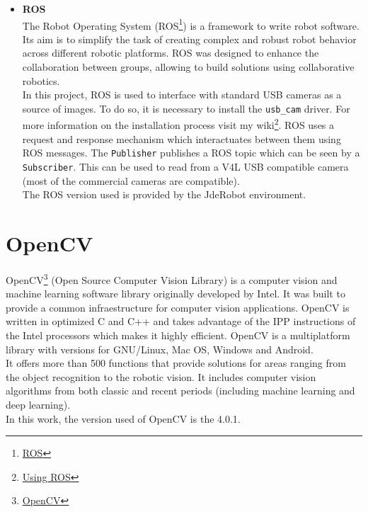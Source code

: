 \begin{itemize}
    \item \textbf{ROS}\\
The Robot Operating System (ROS\footnote {\href{https://www.ros.org/}{ROS}}) is a framework to write robot software. Its aim is to simplify the task of creating complex and robust robot behavior across different robotic platforms. ROS was designed to enhance the collaboration between groups, allowing to build solutions using collaborative robotics.\\
In this project, ROS is used to interface with standard USB cameras as a source of images. To do so, it is necessary to install the \texttt{usb\_cam} driver. For more information on the installation process visit my wiki\footnote {\label{using_ros}\href{https://jderobot.org/Arodriguez-tfm\#Week_24:_Introducing_ROS}{Using ROS}}. ROS uses a request and response mechanism which interactuates between them using ROS messages. The \texttt{Publisher} publishes a ROS topic which can be seen by a \texttt{Subscriber}. This can be used to read from a V4L USB compatible camera (most of the commercial cameras are compatible).\\
The ROS version used is provided by the JdeRobot environment.
\end{itemize}
\section{OpenCV}
OpenCV\footnote {\href{https://opencv.org/}{OpenCV}} (Open Source Computer Vision Library) is a computer vision and machine learning software library originally developed by Intel. It was built to provide a common infraestructure for computer vision applications. OpenCV is written in optimized C and C++ and takes advantage of the IPP instructions of the Intel processors which makes it highly efficient. OpenCV is a multiplatform library with versions for GNU/Linux, Mac OS, Windows and Android.\\ It offers more than 500 functions that provide solutions for areas ranging from the object recognition to the robotic vision. It includes computer vision algorithms from both classic and recent periods (including machine learning and deep learning).\\
In this work, the version used of OpenCV is the 4.0.1.

